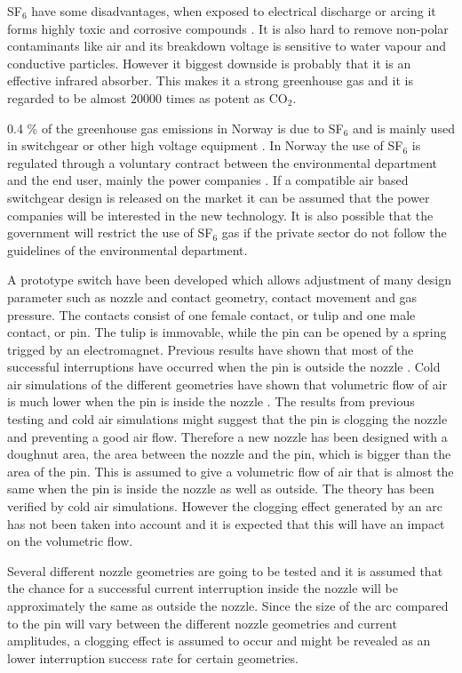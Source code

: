 \documentclass[10pt,a4paper]{article}
\begin{document}
SF$_6$ have some disadvantages, when exposed to electrical discharge or arcing it forms highly toxic and corrosive compounds \cite{bib:SF6PI}. It is also hard to remove non-polar contaminants like air and its breakdown voltage is sensitive to water vapour and conductive particles. However it biggest downside is probably that it is an effective infrared absorber. This makes it a strong greenhouse gas \cite{bib:SF6PI} and it is regarded to be almost $20000$ times as potent as CO$_2$.

0.4 \% of the greenhouse gas emissions in Norway is due to SF$_6$ and is mainly used in switchgear or other high voltage equipment \cite{bib:KlimaKur2020}. In Norway the use of SF$_6$ is regulated through a voluntary contract between the environmental department and the end user, mainly the power companies \cite{bib:KlimaKur2020}. If a compatible air based switchgear design is released on the market it can be assumed that the power companies will be interested in the new technology. It is also possible that the government will restrict the use of SF$_6$ gas if the private sector do not follow the guidelines of the environmental department.

A prototype switch have been developed which allows adjustment of many design parameter such as nozzle and contact geometry, contact movement and gas pressure. The contacts consist of one female contact, or tulip and one male contact, or pin. The tulip is immovable, while the pin can be opened by a spring trigged by an electromagnet. Previous results have shown that most of the successful interruptions have occurred when the pin is outside the nozzle \cite{bib:CIAMVLBS}. Cold air simulations of the different geometries have shown that volumetric flow of air is much lower when the pin is inside the nozzle \cite{NOE}. The results from previous testing and cold air simulations might suggest that the pin is clogging the nozzle and preventing a good air flow. Therefore a new nozzle has been designed with a doughnut area, the area between the nozzle and the pin, which is bigger than the area of the pin. This is assumed to give a volumetric flow of air that is almost the same when the pin is inside the nozzle as well as outside. The theory has been verified by cold air simulations. However the clogging effect generated by an arc has not been taken into account and it is expected that this will have an impact on the volumetric flow.

Several different nozzle geometries are going to be tested and it is assumed that the chance for a successful current interruption inside the nozzle will be approximately the same as outside the nozzle. Since the size of the arc compared to the pin will vary between the different nozzle geometries and current amplitudes, a clogging effect is assumed to occur and might be revealed as an lower interruption success rate for certain geometries.
\end{document}
